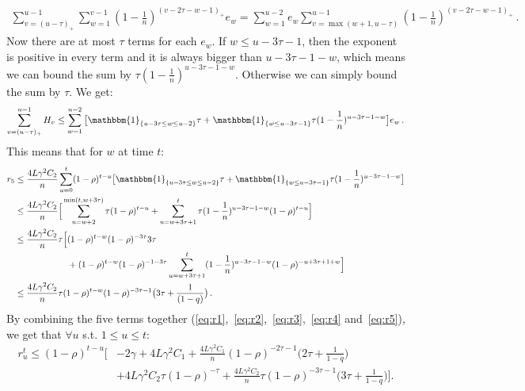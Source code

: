 \documentclass[twoside, 11pt]{article}
\newcommand{\stepsize}{\gamma}
\newcommand{\overlap}{\tau}
\newcommand{\contraction}{\rho}
\newcommand{\lipschitz}{L}
\newcommand{\ind}{\mathbbm{1}}
\begin{document}
\begin{align}
\sum_{v=(u-\overlap)_+}^{u-1} \sum_{w=1}^{v-1}(1-\frac{1}{n})^{(v -2\overlap -w -1)_+} e_w
= \sum_{w=1}^{u-2} e_w \sum_{v=\max(w+1, u-\overlap)}^{u-1} (1-\frac{1}{n})^{(v -2\overlap -w -1)_+}  \, .
\end{align}
Now there are at most $\overlap$ terms for each $e_w$.
If $w \leq u - 3\overlap -1$, then the exponent is positive in every term and it is always bigger than $u -3\overlap -1 -w$, which means we can bound the sum by $\overlap (1-\frac{1}{n})^{u -3\overlap -1 -w}$.
Otherwise we can simply bound the sum by $\overlap$. We get:
\begin{align}
\sum_{v=(u-\overlap)_+}^{u-1} H_v
\leq \sum_{w=1}^{u-2}
	\big[
		\ind_{\{u -3\overlap \leq w \leq u -2\}}\overlap
		+ \ind_{\{w \leq u -3\overlap -1\}}\overlap (1-\frac{1}{n})^{u -3\overlap -1 -w}
	\big] e_w  \, .
\end{align}
This means that for $w$ at time $t$:
\begin{align}\label{eq:r5}
r_5
&\leq \frac{4\lipschitz\stepsize^2 C_2}{n} \sum_{u=0}^t (1 -\contraction)^{t-u}
	\big[
		\ind_{\{u -3\overlap \leq w \leq u -2\}}\overlap
		+ \ind_{\{w \leq u -3\overlap -1\}}\overlap (1-\frac{1}{n})^{u -3\overlap -1 -w}
	\big]
\nonumber \\
&\leq \frac{4\lipschitz\stepsize^2 C_2}{n}
	\Big[
		\sum_{u=w+2}^{\min(t, w +3\overlap)} \overlap (1 -\contraction)^{t-u}
		+ \sum_{u=w +3\overlap +1}^t \overlap (1-\frac{1}{n})^{u -3\overlap -1 -w} (1 -\contraction)^{t-u}
	\Big]
\nonumber \\
&\leq \frac{4\lipschitz\stepsize^2 C_2}{n} \overlap
	\Big[
		(1 -\contraction)^{t-w}(1 -\contraction)^{-3\overlap} 3\overlap
\nonumber \\ &\qquad \qquad \qquad
		+ (1 -\contraction)^{t-w}(1 -\contraction)^{-1 -3\overlap}\sum_{u=w +3\overlap +1}^t (1-\frac{1}{n})^{u -3\overlap -1 -w} (1 -\contraction)^{-u +3\overlap +1 +w}
	\Big]
\nonumber \\
&\leq \frac{4\lipschitz\stepsize^2 C_2}{n} \overlap (1 -\contraction)^{t-w}(1 -\contraction)^{-3\overlap-1}
	\big(
		3\overlap
		+ \frac{1}{(1-q)}
	\big) \,  .
\end{align}
By combining the five terms together (\ref{eq:r1},~\ref{eq:r2},~\ref{eq:r3},~\ref{eq:r4} and~\ref{eq:r5}), we get that $\forall u$ s.t. $1 \leq u \leq t$:
\begin{equation}\label{eq:rut}
\begin{aligned}
r_u^t \leq (1- \contraction)^{t-u}
	\Big[
		&-2 \stepsize
		+4\lipschitz\stepsize^2 C_1
		+\frac{4\lipschitz\stepsize^2 C_1}{n}
			(1 - \contraction)^{-2\overlap -1} \big(
				2\overlap
				+ \frac{1}{1-q}
			\big)
\\
		&+4\lipschitz\stepsize^2 C_2 \overlap(1-\contraction)^{-\overlap}
		+\frac{4\lipschitz\stepsize^2 C_2}{n} \overlap (1 -\contraction)^{-3\overlap -1}
			\big(
				3\overlap
				+ \frac{1}{1-q}
		\big)
	\Big] .
\end{aligned}
\end{equation}
\end{document}
